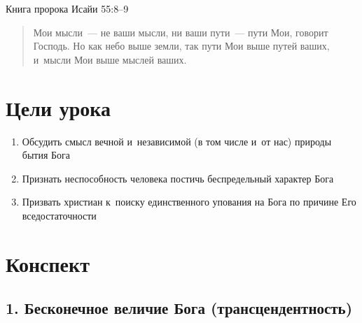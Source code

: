 \documentclass[a4paper,12pt]{article}
\begin{document}
\noindent Книга пророка Исайи 55:8--9

\begin{quote}
Мои мысли~--- не ваши мысли, ни ваши пути~--- пути Мои, говорит Господь.
Но как небо выше земли, так пути Мои выше путей ваших, и~мысли Мои выше мыслей ваших.
\end{quote}

\section*{Цели урока}
\begin{enumerate}
    \item Обсудить смысл вечной и~независимой (в том числе и~от нас) природы бытия Бога
    \item Признать неспособность человека постичь беспредельный характер Бога
    \item Призвать христиан к~поиску единственного упования на Бога по причине Его вседостаточности
\end{enumerate}

\section*{Конспект}

\subsection{1. Бесконечное величие Бога (трансцендентность)}
\end{document}
